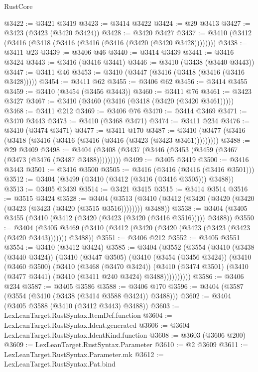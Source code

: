 \begin{lexlean}{RustCore}
\begin{coremodule}
@3422 := @3421 @3419
@3423 := @3414 @3422
@3424 := @29 @3413
@3427 := @3423 (@3423 (@3420 @3424))
@3428 := @3420 @3427
@3437 := @3410 (@3412 (@3416 (@3418 (@3416 (@3416 (@3416 (@3420 (@3420 @3428))))))))
@3438 := @3411 @23
@3439 := @3406 @46
@3440 := @3414 @3439
@3441 := @3416 @3424
@3443 := @3416 (@3416 @3441)
@3446 := @3410 (@3438 (@3440 @3443))
@3447 := @3411 @46
@3453 := @3410 (@3447 (@3416 (@3418 (@3416 (@3416 @3428)))))
@3454 := @3411 @62
@3455 := @3406 @62
@3456 := @3414 @3455
@3459 := @3410 (@3454 (@3456 @3443))
@3460 := @3411 @76
@3461 := @3423 @3427
@3467 := @3410 (@3460 (@3416 (@3418 (@3420 (@3420 @3461)))))
@3468 := @3411 @212
@3469 := @3406 @76
@3470 := @3414 @3469
@3471 := @3470 @3443
@3473 := @3410 (@3468 @3471)
@3474 := @3411 @234
@3476 := @3410 (@3474 @3471)
@3477 := @3411 @170
@3487 := @3410 (@3477 (@3416 (@3418 (@3416 (@3416 (@3416 (@3416 (@3423 (@3423 @3461)))))))))
@3488 := @29 @3409
@3498 := @3404 (@3408 (@3437 (@3446 (@3453 (@3459 (@3467 (@3473 (@3476 (@3487 @3488)))))))))
@3499 := @3405 @3419
@3500 := @3416 @3443
@3501 := @3416 @3500
@3505 := @3416 (@3416 (@3416 (@3416 @3501)))
@3512 := @3404 (@3499 (@3410 (@3412 (@3416 (@3416 @3505))) @3488))
@3513 := @3405 @3439
@3514 := @3421 @3415
@3515 := @3414 @3514
@3516 := @3515 @3424
@3528 := @3404
    (@3513 (@3410 (@3412 (@3420 (@3420 (@3420 (@3423 (@3423 (@3420 (@3515 @3516)))))))) @3488))
@3538 := @3404 (@3405 @3455 (@3410 (@3412 (@3420 (@3423 (@3420 (@3416 @3516))))) @3488))
@3550 := @3404
    (@3405 @3469 (@3410 (@3412 (@3420 (@3420 (@3423 (@3423 (@3423 (@3420 @3443))))))) @3488))
@3551 := @3406 @212
@3552 := @3405 @3551
@3554 := @3410 (@3412 @3424)
@3585 := @3404
    (@3552
      (@3554
        (@3410
          (@3438 (@3440 @3424))
          (@3410
            (@3447 @3505)
            (@3410
              (@3454 (@3456 @3424))
              (@3410
                (@3460 @3500)
                (@3410
                  (@3468 (@3470 @3424))
                  (@3410
                    (@3474 @3501)
                    (@3410 (@3477 @3441) (@3410 (@3411 @240 @3424) @3488))))))))))
@3586 := @3406 @234
@3587 := @3405 @3586
@3588 := @3406 @170
@3596 := @3404 (@3587 (@3554 (@3410 (@3438 (@3414 @3588 @3424)) @3488)))
@3602 := @3404 (@3405 @3588 (@3410 (@3412 @3443) @3488))
@3603 := LexLeanTarget.RustSyntax.ItemDef.function
@3604 := LexLeanTarget.RustSyntax.Ident.generated
@3606 := @3604 LexLeanTarget.RustSyntax.IdentKind.function
@3608 := @3603 (@3606 @200)
@3609 := LexLeanTarget.RustSyntax.Parameter
@3610 := @2 @3609
@3611 := LexLeanTarget.RustSyntax.Parameter.mk
@3612 := LexLeanTarget.RustSyntax.Pat.bind

\end{coremodule}
\end{lexlean}

